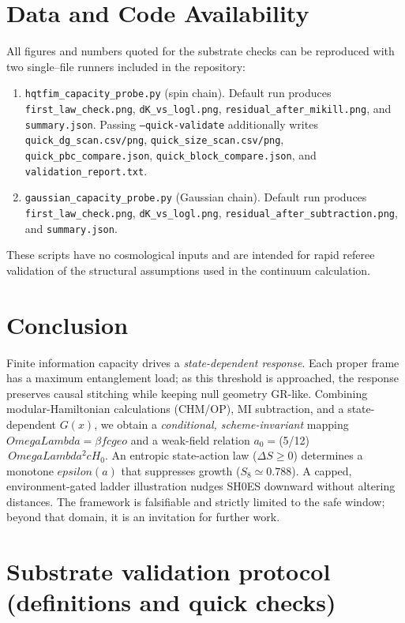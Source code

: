 \documentclass[aps,prd,onecolumn,superscriptaddress,nofootinbib]{revtex4-2}
\def\OmL{OmegaLambda}%
\def\cgeo{cgeo}%
\def\eps{epsilon}%
\newcommand{\OmL}{\Omega_\Lambda}
\newcommand{\cgeo}{c_{\rm geo}}
\newcommand{\eps}{\varepsilon}
\begin{document}
\section{Data and Code Availability}
\label{sec:data-code}
All figures and numbers quoted for the substrate checks can be reproduced with two single–file runners included in the repository:
\begin{enumerate}[leftmargin=1.3em]
\item \texttt{hqtfim\_capacity\_probe.py} (spin chain). Default run produces \texttt{first\_law\_check.png}, \texttt{dK\_vs\_logl.png}, \texttt{residual\_after\_mikill.png}, and \texttt{summary.json}. Passing \texttt{--quick-validate} additionally writes \texttt{quick\_dg\_scan.csv/png}, \texttt{quick\_size\_scan.csv/png}, \texttt{quick\_pbc\_compare.json}, \texttt{quick\_block\_compare.json}, and \texttt{validation\_report.txt}.
\item \texttt{gaussian\_capacity\_probe.py} (Gaussian chain). Default run produces \texttt{first\_law\_check.png}, \texttt{dK\_vs\_logl.png}, \texttt{residual\_after\_subtraction.png}, and \texttt{summary.json}.
\end{enumerate}
These scripts have no cosmological inputs and are intended for rapid referee validation of the structural assumptions used in the continuum calculation.

\section{Conclusion}
Finite information capacity drives a \emph{state-dependent response}. Each proper frame has a maximum entanglement load; as this threshold is approached, the response preserves causal stitching while keeping null geometry GR-like. Combining modular-Hamiltonian calculations (CHM/OP), MI subtraction, and a state-dependent $G(x)$, we obtain a \emph{conditional, scheme-invariant} mapping $\OmL=\beta f \cgeo$ and a weak-field relation $a_0=$(5/12)$\,\OmL^2 cH_0$. An entropic state-action law ($\Delta S\ge 0$) determines a monotone $\eps(a)$ that suppresses growth ($S_8\simeq 0.788$). A capped, environment-gated ladder illustration nudges SH0ES downward without altering distances. The framework is falsifiable and strictly limited to the safe window; beyond that domain, it is an invitation for further work.

\appendix

\section{Substrate validation protocol (definitions and quick checks)}
\label{app:substrate-protocol}
\end{document}
